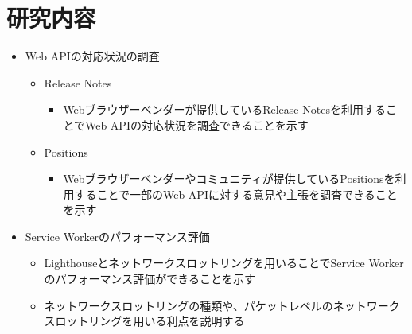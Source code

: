 \section{研究内容}\label{section:研究内容}
\begin{itemize}
  \item Web APIの対応状況の調査
  \begin{itemize}
    \item Release Notes
    \begin{itemize}
      \item Webブラウザーベンダーが提供しているRelease Notesを利用することでWeb APIの対応状況を調査できることを示す
    \end{itemize}
    \item Positions
    \begin{itemize}
      \item Webブラウザーベンダーやコミュニティが提供しているPositionsを利用することで一部のWeb APIに対する意見や主張を調査できることを示す
    \end{itemize}
  \end{itemize}
  \item Service Workerのパフォーマンス評価
  \begin{itemize}
    \item Lighthouseとネットワークスロットリングを用いることでService Workerのパフォーマンス評価ができることを示す
    \item ネットワークスロットリングの種類や、パケットレベルのネットワークスロットリングを用いる利点を説明する
  \end{itemize}
\end{itemize}